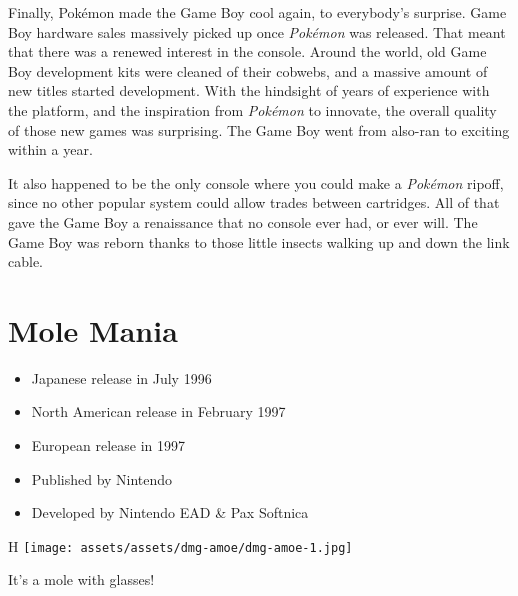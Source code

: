 \documentclass{book}
\begin{document}
Finally, Pokémon made the Game Boy cool again, to everybody’s surprise. Game Boy hardware sales massively picked up once \emph{Pokémon} was released. That meant that there was a renewed interest in the console. Around the world, old Game Boy development kits were cleaned of their cobwebs, and a massive amount of new titles started development. With the hindsight of years of experience with the platform, and the inspiration from \emph{Pokémon} to innovate, the overall quality of those new games was surprising. The Game Boy went from also-ran to exciting within a year.

It also happened to be the only console where you could make a \emph{Pokémon} ripoff, since no other popular system could allow trades between cartridges. All of that gave the Game Boy a renaissance that no console ever had, or ever will. The Game Boy was reborn thanks to those little insects walking up and down the link cable.


\begingroup \chapter*{Mole Mania} \endgroup

\begin{itemize} \setlength\itemsep{-0.4em}
\item Japanese release in July 1996
\item North American release in February 1997
\item European release in 1997
\item Published by Nintendo
\item Developed by Nintendo EAD \& Pax Softnica
\end{itemize}\noindent

\begin{wrapfigure}{H}{\linewidth}
\vskip 4pt
\centering \texttt{[image: assets/assets/dmg-amoe/dmg-amoe-1.jpg]}\par\pagetwodescription It’s a mole with glasses!\end{wrapfigure}
\clearpage
\end{document}
